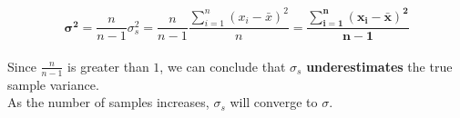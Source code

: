 \documentclass[12pt, a4paper, twoside]{article}
\begin{document}
\begin{equation}
	\mathbf{\sigma^2} = \frac{n}{n-1} \sigma_s^2 = \frac{n}{n-1} \frac{\sum_{i=1}^{n}(x_i - \bar{x})^2}{n} = \mathbf{\frac{\sum_{i=1}^{n}(x_i - \bar{x})^2}{n - 1}}
\end{equation}
\\[1em]
Since $\frac{n}{n-1}$ is greater than $1$, we can conclude that $\sigma_{s}$ \textbf{underestimates} the true sample variance.\\
As the number of samples increases, $\sigma_{s}$ will converge to $\sigma$.




\end{document}
